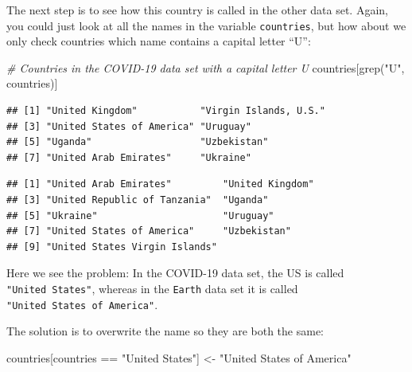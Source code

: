 \documentclass[
]{book}
\newenvironment{Shaded}{\begin{snugshade}}{\end{snugshade}}
\newcommand{\CommentTok}[1]{\textcolor[rgb]{0.56,0.35,0.01}{\textit{#1}}}
\newcommand{\FunctionTok}[1]{\textcolor[rgb]{0.00,0.00,0.00}{#1}}
\newcommand{\NormalTok}[1]{#1}
\newcommand{\OtherTok}[1]{\textcolor[rgb]{0.56,0.35,0.01}{#1}}
\newcommand{\SpecialCharTok}[1]{\textcolor[rgb]{0.00,0.00,0.00}{#1}}
\newcommand{\StringTok}[1]{\textcolor[rgb]{0.31,0.60,0.02}{#1}}
\begin{document}
The next step is to see how this country is called in the other data set. Again, you could just look at all the names in the variable \texttt{countries}, but how about we only check countries which name contains a capital letter ``U'':

\begin{Shaded}
\begin{Highlighting}[]
\CommentTok{\# Countries in the COVID{-}19 data set with a capital letter U}
\NormalTok{countries[}\FunctionTok{grep}\NormalTok{(}\StringTok{"U"}\NormalTok{, countries)]}
\end{Highlighting}
\end{Shaded}

\begin{verbatim}
## [1] "United Kingdom"           "Virgin Islands, U.S."    
## [3] "United States of America" "Uruguay"                 
## [5] "Uganda"                   "Uzbekistan"              
## [7] "United Arab Emirates"     "Ukraine"
\end{verbatim}

\begin{Shaded}
\end{Shaded}

\begin{verbatim}
## [1] "United Arab Emirates"         "United Kingdom"              
## [3] "United Republic of Tanzania"  "Uganda"                      
## [5] "Ukraine"                      "Uruguay"                     
## [7] "United States of America"     "Uzbekistan"                  
## [9] "United States Virgin Islands"
\end{verbatim}

Here we see the problem: In the COVID-19 data set, the US is called \texttt{"United\ States"}, whereas in the \texttt{Earth} data set it is called \texttt{"United\ States\ of\ America"}.

The solution is to overwrite the name so they are both the same:

\begin{Shaded}
\begin{Highlighting}[]
\NormalTok{countries[countries }\SpecialCharTok{==} \StringTok{"United States"}\NormalTok{] }\OtherTok{\textless{}{-}} \StringTok{"United States of America"}
\end{Highlighting}
\end{Shaded}
\end{document}
